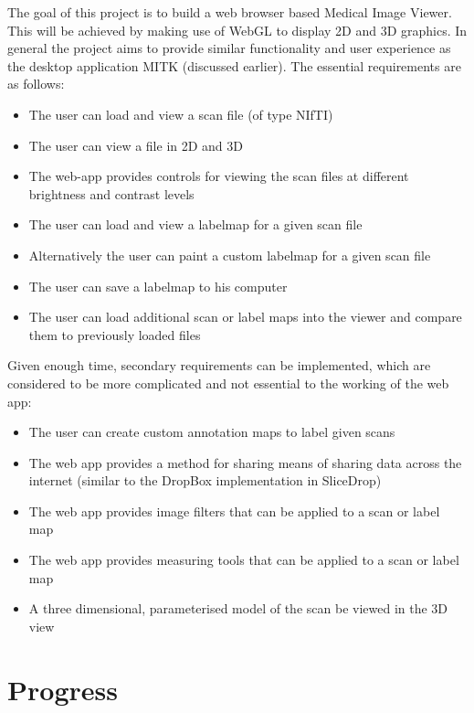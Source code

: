 \documentclass[a4paper,11pt,titlepage]{article}
\begin{document}
The goal of this project is to build a web browser based Medical Image Viewer. This will be achieved by making use of WebGL to display 2D and 3D graphics. In general the project aims to provide similar functionality and user experience as the desktop application MITK (discussed earlier). The essential requirements are as follows:

\begin{itemize}
\item The user can load and view a scan file (of type NIfTI)
\item The user can view a file in 2D and 3D
\item The web-app provides controls for viewing the scan files at different brightness and contrast levels
\item The user can load and view a labelmap for a given scan file
\item Alternatively the user can paint a custom labelmap for a given scan file
\item The user can save a labelmap to his computer
\item The user can load additional scan or label maps into the viewer and compare them to previously loaded files
\end{itemize}

Given enough time, secondary requirements can be implemented, which are considered to be more complicated and not essential to the working of the web app:

\begin{itemize}
\item The user can create custom annotation maps to label given scans
\item The web app provides a method for sharing  means of sharing data across the internet (similar to the DropBox implementation in SliceDrop)
\item The web app provides image filters that can be applied to a scan or label map
\item The web app provides measuring tools that can be applied to a scan or label map
\item A three dimensional, parameterised model of the scan be viewed in the 3D view
\end{itemize}

\section{Progress}
\end{document}

